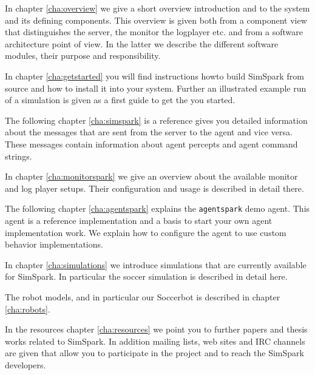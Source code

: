 In chapter \ref{cha:overview} we give a short overview introduction
and to the system and its defining components. This overview is given
both from a component view that distinguishes the server, the monitor
the logplayer etc. and from a software architecture point of view. In
the latter we describe the different software modules, their purpose
and responsibility.

In chapter \ref{cha:getstarted} you will find instructions howto build
SimSpark from source and how to install it into your system. Further
an illustrated example run of a simulation is given as a first guide
to get the you started.

The following chapter \ref{cha:simspark} is a reference gives you
detailed information about the messages that are sent from the server
to the agent and vice versa. These messages contain information about
agent percepts and agent command strings.

In chapter \ref{cha:monitorspark} we give an overview about the
available monitor and log player setups. Their configuration and usage
is described in detail there.

The following chapter \ref{cha:agentspark} explains the
\texttt{agentspark} demo agent. This agent is a reference implementation and 
a basis to start your own agent implementation work. We explain how
to configure the agent to use custom behavior implementations.

In chapter \ref{cha:simulations} we introduce simulations that are
currently available for SimSpark. In particular the soccer simulation
is described in detail here.

The robot models, and in particular our Soccerbot is described in
chapter \ref{cha:robots}.

In the resources chapter \ref{cha:resources} we point you to further
papers and thesis works related to SimSpark. In addition mailing
lists, web sites and IRC channels are given that allow you to
participate in the project and to reach the SimSpark developers.


